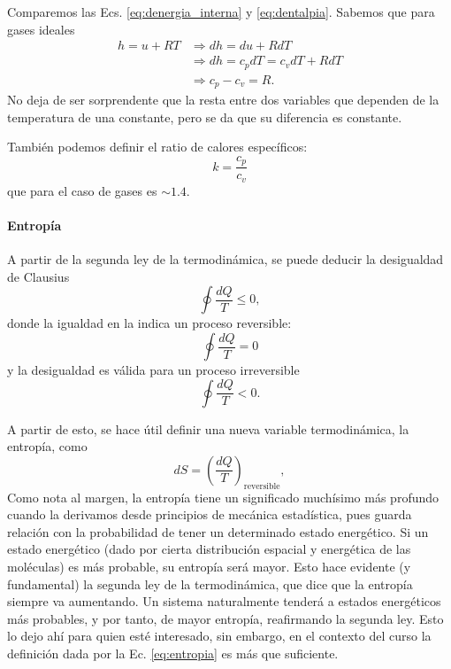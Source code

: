 Comparemos las Ecs. \eqref{eq:denergia_interna} y \eqref{eq:dentalpia}.
Sabemos que para gases ideales
%
\begin{align}
h = u + RT &\Rightarrow dh = du + RdT\nonumber\\
&\Rightarrow dh = c_pdT = c_vdT + RdT\nonumber\\
&\Rightarrow c_p-c_v=R.
\end{align}
%
No deja de ser sorprendente que la resta entre dos variables que dependen de la temperatura de una constante, pero se da que su diferencia es constante.

También podemos definir el ratio de calores específicos:
%
\begin{equation}
k = \frac{c_p}{c_v}
\end{equation}
%
que para el caso de gases es $\sim1.4$.

\paragraph*{Entropía}
A partir de la segunda ley de la termodinámica, se puede deducir la desigualdad de Clausius
%
\begin{equation}\label{eq:clausius}
\oint \frac{dQ}{T}\leq0,
\end{equation}
% 
donde la igualdad en la indica un proceso reversible:
%
\begin{equation}\label{eq:clausius_rev}
\oint \frac{dQ}{T}=0
\end{equation}
%
y la desigualdad es válida para un proceso irreversible
%
\begin{equation}
\oint\frac{dQ}{T}<0.
\end{equation}

A partir de esto, se hace útil definir una nueva variable termodinámica, la entropía, como
%
\begin{equation}\label{eq:entropia}
dS = \left(\frac{dQ}{T}\right)_\text{reversible},
\end{equation}
%
Como nota al margen, la entropía tiene un significado muchísimo más profundo cuando la derivamos desde principios de mecánica estadística, pues guarda relación con la probabilidad de tener un determinado estado energético.
Si un estado energético (dado por cierta distribución espacial y energética de las moléculas) es más probable, su entropía será mayor.
Esto hace evidente (y fundamental) la segunda ley de la termodinámica, que dice que la entropía siempre va aumentando.
Un sistema naturalmente tenderá a estados energéticos más probables, y por tanto, de mayor entropía, reafirmando la segunda ley.
Esto lo dejo ahí para quien esté interesado, sin embargo, en el contexto del curso la definición dada por la Ec. \eqref{eq:entropia} es más que suficiente.

